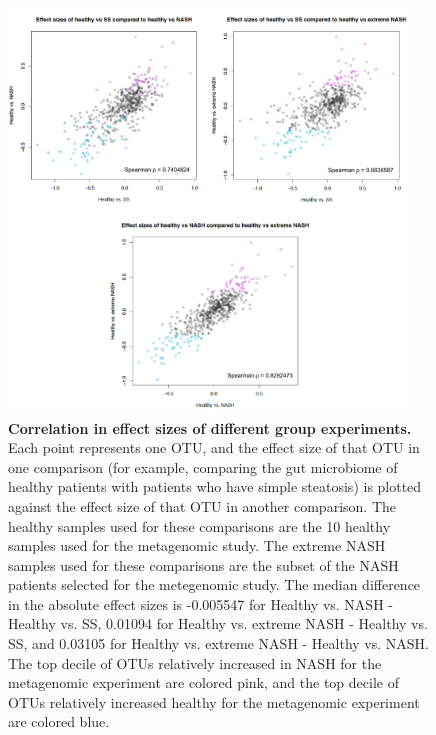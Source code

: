 \begin{figure}[h]
\begin{center}
\includegraphics[width=0.95\textwidth]{nafld_16s_effect_sizes.png}
\caption[Correlation in effect sizes of different group experiments.]{\textbf{Correlation in effect sizes of different group experiments.} Each point represents one OTU, and the effect size of that OTU in one comparison (for example, comparing the gut microbiome of healthy patients with patients who have simple steatosis) is plotted against the effect size of that OTU in another comparison. The healthy samples used for these comparisons are the 10 healthy samples used for the metagenomic study. The extreme NASH samples used for these comparisons are the subset of the NASH patients selected for the metegenomic study. The median difference in the absolute effect sizes is -0.005547 for Healthy vs. NASH - Healthy vs. SS, 0.01094 for Healthy vs. extreme NASH - Healthy vs. SS, and 0.03105 for Healthy vs. extreme NASH - Healthy vs. NASH. The top decile of OTUs relatively increased in NASH for the metagenomic experiment are colored pink, and the top decile of OTUs relatively increased healthy for the metagenomic experiment are colored blue.}
\end{center}
\label{nafld_fig4}
\end{figure}

\FloatBarrier

